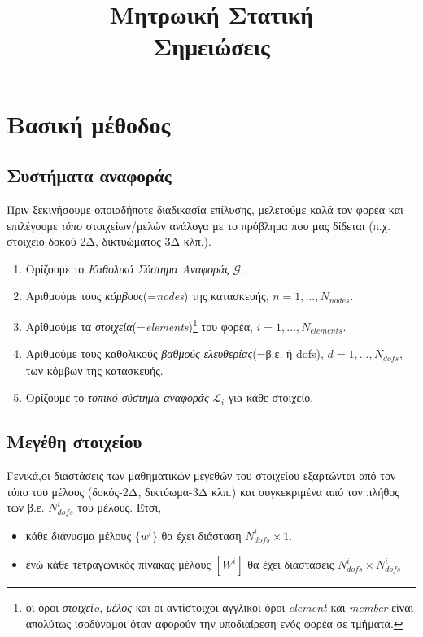 \documentclass[a4paper, twocolumn]{article}
\title{Μητρωική Στατική\\
\Large Σημειώσεις}
\date{}
\newcommand{\num}[1]{ N_{\mathit{#1}} }
\newcommand{\gs}{\mathcal{G}}
\newcommand{\ls}{\mathcal{L}_i}
\newcommand{\vect}[1]{ \{ #1\} }
\newcommand{\mat}[1]{\left[ #1 \right]}
\begin{document}
\maketitle

\section{Βασική μέθοδος}

\subsection{Συστήματα αναφοράς}
Πριν ξεκινήσουμε οποιαδήποτε διαδικασία επίλυσης, μελετούμε καλά τον 
φορέα και επιλέγουμε \emph{τύπο} στοιχείων/μελών ανάλογα με το 
πρόβλημα που μας δίδεται (π.χ. στοιχείο δοκού 2Δ, δικτυώματος 3Δ 
κλπ.).
\begin{enumerate}
	\item Oρίζουμε το \emph{Καθολικό Σύστημα Αναφοράς} $\gs$.
	\item Αριθμούμε τους \emph{κόμβους}(=\emph{nodes}) της 
	κατασκευής, $n=1, 
	\dots,\num{nodes}$.
	\item Αρίθμούμε τα \emph{στοιχεία}(=\emph{elements})\footnote{
	οι όροι \emph{στοιχείo}, \emph{μέλος} και οι αντίστοιχοι αγγλικοί 
	όροι \emph{element} και \emph{member} είναι απολύτως ισοδύναμοι 
	όταν αφορούν την υποδιαίρεση ενός φορέα σε τμήματα.} του φορέα, 
	$i=1, \dots, \num{elements}$.
	\item Αριθμούμε τους καθολικούς \emph{βαθμούς ελευθερίας}(=β.ε. ή 
	dofs), $d=1, \dots, \num{dofs}$,
	των κόμβων της κατασκευής.

	\item Ορίζουμε το \emph{τοπικό σύστημα αναφοράς} $\ls$ 
	για κάθε στοιχείο.
\end{enumerate}

\subsection{Μεγέθη στοιχείου}
Γενικά,οι διαστάσεις των μαθηματικών μεγεθών του στοιχείου 
εξαρτώνται από τον τύπο του 
μέλους (δοκός-2Δ, δικτύωμα-3Δ κλπ.) και συγκεκριμένα 
από τον πλήθος των β.ε. $\num{dofs}^i$ του μέλους. Έτσι,
\begin{itemize}
	\item κάθε διάνυσμα μέλους $\vect{w^i}$ θα έχει διάσταση 
	$\num{dofs}^i \times 1$.
	\item ενώ κάθε τετραγωνικός πίνακας μέλους $\mat{W^i}$ θα έχει 
	διαστάσεις $\num{dofs}^i  \times \num{dofs}^i$
\end{itemize}
\end{document}
